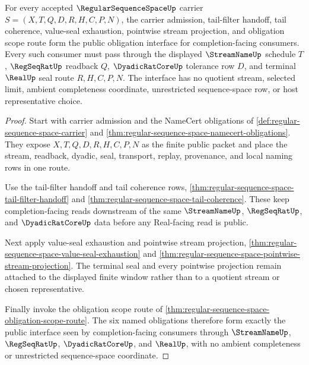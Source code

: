 \begin{theorem}
\label{thm:regular-sequence-space-obligation-public-interface}
For every accepted $\RegularSequenceSpaceUp$ carrier $S=(X,T,Q,D,R,H,C,P,N)$, the carrier admission, tail-filter handoff, tail coherence, value-seal exhaustion, pointwise stream projection, and obligation scope route form the public obligation interface for completion-facing consumers. Every such consumer must pass through the displayed $\StreamNameUp$ schedule $T$, $\RegSeqRatUp$ readback $Q$, $\DyadicRatCoreUp$ tolerance row $D$, and terminal $\RealUp$ seal route $R,H,C,P,N$. The interface has no quotient stream, selected limit, ambient completeness coordinate, unrestricted sequence-space row, or host representative choice.
\end{theorem}
\begin{proof}
Start with carrier admission and the NameCert obligations of \autoref{def:regular-sequence-space-carrier} and \autoref{thm:regular-sequence-space-namecert-obligations}. They expose $X,T,Q,D,R,H,C,P,N$ as the finite public packet and place the stream, readback, dyadic, seal, transport, replay, provenance, and local naming rows in one route.

Use the tail-filter handoff and tail coherence rows, \autoref{thm:regular-sequence-space-tail-filter-handoff} and \autoref{thm:regular-sequence-space-tail-coherence}. These keep completion-facing reads downstream of the same $\StreamNameUp$, $\RegSeqRatUp$, and $\DyadicRatCoreUp$ data before any Real-facing read is public.

Next apply value-seal exhaustion and pointwise stream projection, \autoref{thm:regular-sequence-space-value-seal-exhaustion} and \autoref{thm:regular-sequence-space-pointwise-stream-projection}. The terminal seal and every pointwise projection remain attached to the displayed finite window rather than to a quotient stream or chosen representative.

Finally invoke the obligation scope route of \autoref{thm:regular-sequence-space-obligation-scope-route}. The six named obligations therefore form exactly the public interface seen by completion-facing consumers through $\StreamNameUp$, $\RegSeqRatUp$, $\DyadicRatCoreUp$, and $\RealUp$, with no ambient completeness or unrestricted sequence-space coordinate.
\end{proof}

